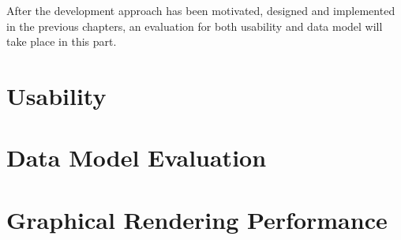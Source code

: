 After the development approach has been motivated, designed and implemented in the previous chapters, an evaluation for both usability and data model  will take place in this part.


\section{Usability} \label{sec:eval-usability}


\section{Data Model Evaluation}


\section{Graphical Rendering Performance}





